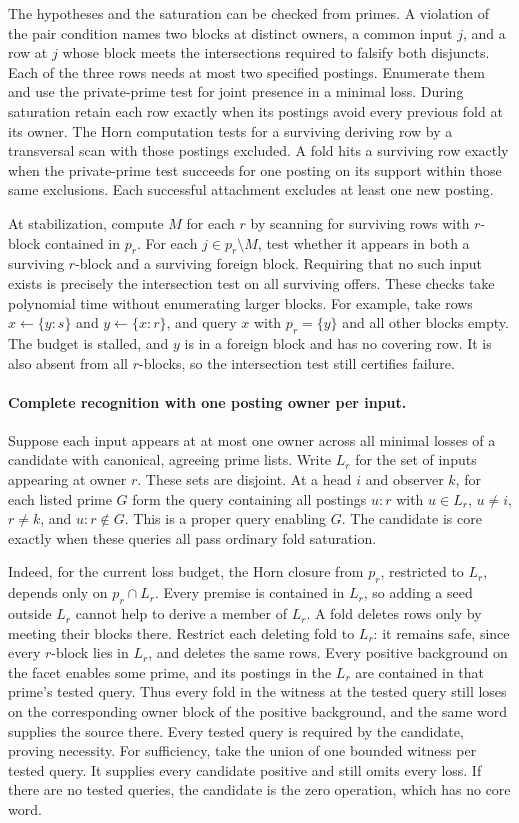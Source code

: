 The hypotheses and the saturation can be checked from
primes. A violation of the pair condition names two
blocks at distinct owners, a common input $j$, and a
row at $j$ whose block meets the intersections required
to falsify both disjuncts. Each of the three rows needs
at most two specified postings. Enumerate them and use
the private-prime test for joint presence in a minimal
loss. During saturation retain each row exactly when
its postings avoid every previous fold at its owner.
The Horn computation tests for a surviving deriving
row by a transversal scan with those postings excluded.
A fold hits a surviving row exactly when the private-prime
test succeeds for one posting on its support within those
same exclusions. Each successful attachment excludes at
least one new posting.

At stabilization, compute $M$ for each $r$ by scanning
for surviving rows with $r$-block contained in $p_r$.
For each $j\in p_r\setminus M$, test whether it appears
in both a surviving $r$-block and a surviving foreign
block. Requiring that no such input exists is precisely
the intersection test on all surviving offers. These
checks take polynomial time without enumerating larger
blocks. For example, take rows $x\gets\{y:s\}$ and
$y\gets\{x:r\}$, and query $x$ with $p_r=\{y\}$ and
all other blocks empty. The budget is stalled, and $y$
is in a foreign block and has no covering row. It is
also absent from all $r$-blocks, so the intersection
test still certifies failure.

\paragraph{Complete recognition with one posting owner per input.}
Suppose each input appears at at most one owner across all
minimal losses of a candidate with canonical, agreeing
prime lists. Write $L_r$ for the set of inputs appearing at
owner $r$. These sets are disjoint. At a head $i$ and
observer $k$, for each listed prime $G$ form the query
containing all postings $u:r$ with $u\in L_r$, $u\ne i$,
$r\ne k$, and $u:r\notin G$. This is a proper query
enabling $G$. The candidate is core exactly when these
queries all pass ordinary fold saturation.

Indeed, for the current loss budget, the Horn closure
from $p_r$, restricted to $L_r$, depends only on
$p_r\cap L_r$. Every premise is contained in $L_r$,
so adding a seed outside $L_r$ cannot help to derive
a member of $L_r$. A fold deletes rows only by meeting
their blocks there. Restrict each deleting fold to
$L_r$: it remains safe, since every $r$-block lies in
$L_r$, and deletes the same rows. Every positive
background on the facet enables some prime, and its
postings in the $L_r$ are contained in that prime's
tested query. Thus every fold in the witness at the
tested query still loses on the corresponding owner
block of the positive background, and the same word
supplies the source there. Every
tested query is required by the candidate, proving
necessity. For sufficiency, take the union of one
bounded witness per tested query. It supplies every
candidate positive and still omits every loss. If
there are no tested queries, the candidate is the
zero operation, which has no core word.

